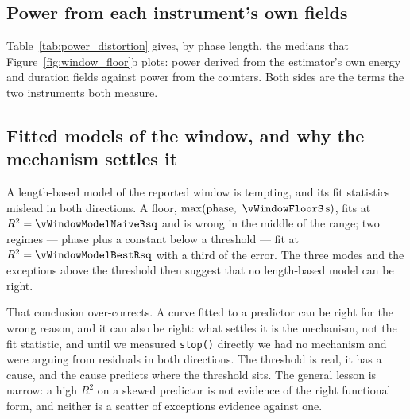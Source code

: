 \subsection{Power from each instrument's own fields}
\label{app:power}

Table~\ref{tab:power_distortion} gives, by phase length, the medians that
Figure~\ref{fig:window_floor}b plots: power derived from the estimator's own
energy and duration fields against power from the counters. Both sides are the
terms the two instruments both measure.

\begin{table}[t]
\centering
\caption{Power derived from the estimator's own energy and duration fields
against power from the counters, by phase length. No model is fitted: each
instrument is divided by itself, on the terms both of them measure. The last
column is the median of the per-block ratios, not the quotient of the two
medians beside it.}
\label{tab:power_distortion}
{\footnotesize\setlength{\tabcolsep}{3pt}}
\end{table}

\subsection{Fitted models of the window, and why the mechanism settles it}
\label{app:route}

A length-based model of the reported window is tempting, and its fit statistics
mislead in both directions. A floor, $\max(\text{phase},\
\vWindowFloorS\,\text{s})$, fits at $R^2 = \vWindowModelNaiveRsq$ and is wrong in
the middle of the range; two regimes --- phase plus a constant below a
threshold --- fit at $R^2 = \vWindowModelBestRsq$ with a third of the error. The
three modes and the exceptions above the threshold then suggest that no
length-based model can be right.

That conclusion over-corrects. A curve fitted to a predictor can be
right for the wrong reason, and it can also be right: what settles it is the
mechanism, not the fit statistic, and until we measured
\texttt{stop()} directly we had no mechanism and were arguing from residuals in
both directions. The threshold is real, it has a cause, and the cause predicts
where the threshold sits. The general lesson is narrow: a high $R^2$ on a skewed predictor is not evidence of the
right functional form, and neither is a scatter of exceptions evidence against
one.

